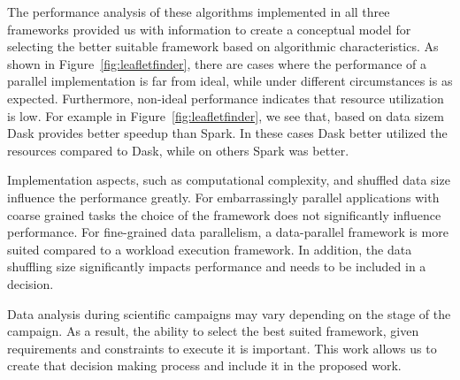 The performance analysis of these algorithms implemented in all three frameworks 
provided us with information to create a conceptual model for selecting the 
better suitable framework based on algorithmic characteristics. As shown in 
Figure~\ref{fig:leafletfinder}, there are cases where the performance of a 
parallel implementation is far from ideal, while under different circumstances 
is as expected. Furthermore, non-ideal performance indicates that resource 
utilization is low. For example in Figure~\ref{fig:leafletfinder}, we see that, 
based on data sizem Dask provides better speedup than Spark. In these cases Dask 
better utilized the resources compared to Dask, while on others Spark was 
better.

Implementation aspects, such as computational complexity, and shuffled data 
size influence the performance greatly. For embarrassingly parallel 
applications with coarse grained tasks the choice of the framework does not 
significantly influence performance. For fine-grained data parallelism, a 
data-parallel framework is more suited compared to a workload execution 
framework. In addition, the data shuffling size significantly impacts 
performance and needs to be included in a decision.

Data analysis during scientific campaigns may vary depending on the stage of 
the campaign. As a result, the ability to select the best suited framework, 
given requirements and constraints to execute it is important. This work allows 
us to create that decision making process and include it in the proposed work.
